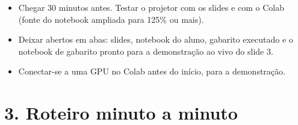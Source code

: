 \documentclass[
  11pt,
]{article}
\providecommand{\tightlist}{%
  \setlength{\itemsep}{0pt}\setlength{\parskip}{0pt}}
\begin{document}
\begin{itemize}
\tightlist
\item
  Chegar 30 minutos antes. Testar o projetor com os slides e com o Colab
  (fonte do notebook ampliada para 125\% ou mais).
\item
  Deixar abertos em abas: slides, notebook do aluno, gabarito executado
  e o notebook de gabarito pronto para a demonstração ao vivo do slide
  3.
\item
  Conectar-se a uma GPU no Colab antes do início, para a demonstração.
\end{itemize}

\section{3. Roteiro minuto a minuto}\label{roteiro-minuto-a-minuto}
\end{document}
